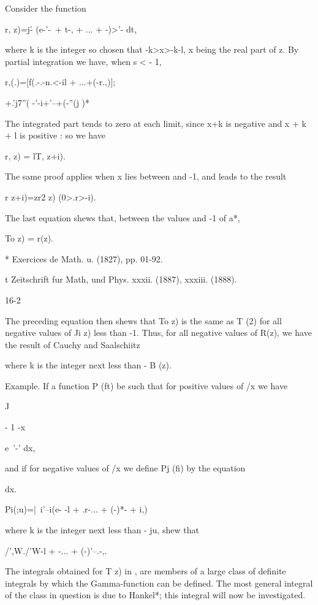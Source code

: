 Consider the function

r, z)=j\'- (e-'-\ + t-, + ... + -)>'- dt,

where k is the integer so chosen that -k>x>-k-l, x being the real part
of z. By partial integration we have, when s < - 1,

r,(.)=[f(.-.-n.<-il + ...+(-r.,)];

+.'j7''( -'-i+'--+(-''(j )*

The integrated part tends to zero at each limit, since x+k is negative
and x + k + l is positive : so we have

r, z) = lT, z+i).

The same proof applies when x lies between and -1, and leads to the
result

r z+i)=zr2 z) (0>.r>-i).

The last equation shews that, between the values and -1 of a*,

To z) = r(z).

* Exercices de Math. u. (1827), pp. 01-92.

t Zeitschrift fur Math, und Phys. xxxii. (1887), xxxiii. (1888).

16-2

%
%

The preceding equation then shews that To z) is the same as T (2) for
all negative values of Ji z) less than -1. Thus, for all negative
values of R(z), we have the result of Cauchy and Saalschiitz

where k is the integer next less than - B (z).

Example. If a function P (ft) be such that for positive values of /x
we have

J

- 1 -x

e~'-' dx,

and if for negative values of /x we define Pj (fi) by the equation

dx.

Pi(;u)=|\ i'--i(e- -l + .r-... + (-)*- + i,)

where k is the integer next less than - ju, shew that

/',W./'W-l + -... + (-)'--.-,. 


The integrals obtained for T z) in
,  %
are members of a
large class of definite integrals by which the Gamma-function can be
defined. The most general integral of the class in question is due to
Hankel*; this integral will now be investigated.

